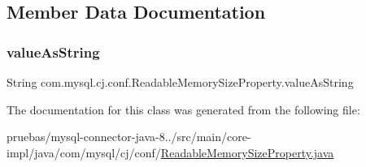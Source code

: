 \subsection{Member Data Documentation}
\mbox{\label{classcom_1_1mysql_1_1cj_1_1conf_1_1_readable_memory_size_property_a8a60af4f9a466b59aca2f18f55d6a096}} 
\subsubsection{\texorpdfstring{value\+As\+String}{valueAsString}}
{\footnotesize\ttfamily String com.\+mysql.\+cj.\+conf.\+Readable\+Memory\+Size\+Property.\+value\+As\+String\hspace{0.3cm}{\ttfamily [protected]}}



The documentation for this class was generated from the following file\+:\begin{DoxyCompactItemize}
\item 
pruebas/mysql-\/connector-\/java-\/8../src/main/core-\/impl/java/com/mysql/cj/conf/\mbox{\hyperlink{_readable_memory_size_property_8java}{Readable\+Memory\+Size\+Property.\+java}}\end{DoxyCompactItemize}
